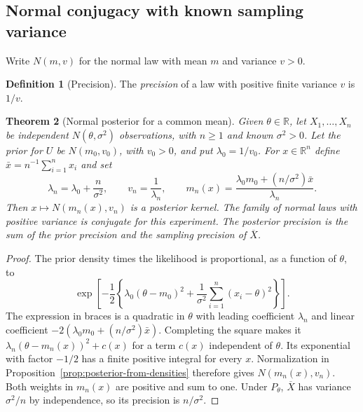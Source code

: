 \documentclass[11pt,oneside]{book}
\newtheorem{theorem}{Theorem}[chapter]
\theoremstyle{definition}
\newtheorem{definition}[theorem]{Definition}
\theoremstyle{remark}
\newcommand{\R}{\mathbb R}
\begin{document}
\subsection{Normal conjugacy with known sampling variance}
\label{subsec:bayesian-normal-known-variance}

Write $N(m,v)$ for the normal law with mean $m$ and variance $v>0$.

\begin{definition}[Precision]
\label{def:bayesian-normal-precision}
The \emph{precision} of a law with positive finite variance $v$ is
$1/v$.
\end{definition}

\begin{theorem}[Normal posterior for a common mean]
\label{thm:bayesian-normal-mean-posterior}
Given $\theta\in\R$, let $X_1,\ldots,X_n$ be independent
$N(\theta,\sigma^2)$ observations, with $n\geq1$ and known
$\sigma^2>0$. Let the prior for $U$ be $N(m_0,v_0)$, with $v_0>0$,
and put $\lambda_0=1/v_0$. For $x\in\R^n$ define
$\bar x=n^{-1}\sum_{i=1}^n x_i$ and set
\begin{equation}
\lambda_n=\lambda_0+\frac{n}{\sigma^2},\qquad
v_n=\frac{1}{\lambda_n},\qquad
m_n(x)=\frac{\lambda_0m_0+(n/\sigma^2)\bar x}{\lambda_n}.
\label{eq:bayesian-normal-precision-update}
\end{equation}
Then $x\mapsto N(m_n(x),v_n)$ is a posterior kernel.
The family of normal laws with positive variance is conjugate for
this experiment. The posterior precision is the sum of the prior
precision and the sampling precision of $\overline X$.
\end{theorem}
\begin{proof}
The prior density times the likelihood is proportional, as a
function of $\theta$, to
\[
\exp\!\left[-\frac12\left\{
\lambda_0(\theta-m_0)^2+\frac{1}{\sigma^2}
\sum_{i=1}^n(x_i-\theta)^2\right\}\right].
\]
The expression in braces is a quadratic in $\theta$ with leading
coefficient $\lambda_n$ and linear coefficient
$-2(\lambda_0m_0+(n/\sigma^2)\bar x)$. Completing the square
makes it $\lambda_n(\theta-m_n(x))^2+c(x)$ for a term $c(x)$
independent of $\theta$. Its exponential with factor $-1/2$
has a finite positive integral for every $x$. Normalization in
Proposition~\ref{prop:posterior-from-densities} therefore gives
$N(m_n(x),v_n)$. Both weights in $m_n(x)$ are positive and sum
to one. Under $P_\theta$, $\overline X$ has variance $\sigma^2/n$
by independence, so its precision is $n/\sigma^2$.
\end{proof}
\end{document}
